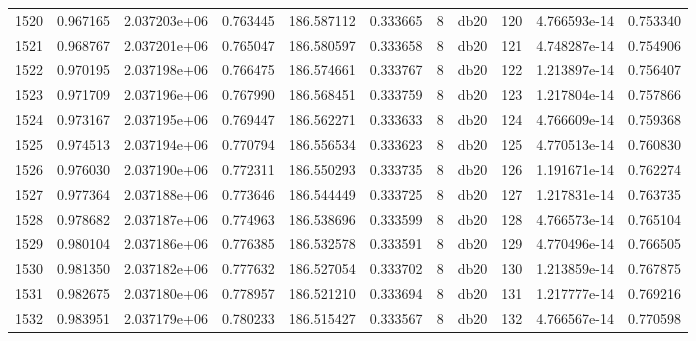 \begin{tabular}{lrrrrrrlrrr}
1520 &    0.967165 &        2.037203e+06 &  0.763445 &              186.587112 &    0.333665 &       8 &         db20 &    120 &   4.766593e-14 &      0.753340 \\
1521 &    0.968767 &        2.037201e+06 &  0.765047 &              186.580597 &    0.333658 &       8 &         db20 &    121 &   4.748287e-14 &      0.754906 \\
1522 &    0.970195 &        2.037198e+06 &  0.766475 &              186.574661 &    0.333767 &       8 &         db20 &    122 &   1.213897e-14 &      0.756407 \\
1523 &    0.971709 &        2.037196e+06 &  0.767990 &              186.568451 &    0.333759 &       8 &         db20 &    123 &   1.217804e-14 &      0.757866 \\
1524 &    0.973167 &        2.037195e+06 &  0.769447 &              186.562271 &    0.333633 &       8 &         db20 &    124 &   4.766609e-14 &      0.759368 \\
1525 &    0.974513 &        2.037194e+06 &  0.770794 &              186.556534 &    0.333623 &       8 &         db20 &    125 &   4.770513e-14 &      0.760830 \\
1526 &    0.976030 &        2.037190e+06 &  0.772311 &              186.550293 &    0.333735 &       8 &         db20 &    126 &   1.191671e-14 &      0.762274 \\
1527 &    0.977364 &        2.037188e+06 &  0.773646 &              186.544449 &    0.333725 &       8 &         db20 &    127 &   1.217831e-14 &      0.763735 \\
1528 &    0.978682 &        2.037187e+06 &  0.774963 &              186.538696 &    0.333599 &       8 &         db20 &    128 &   4.766573e-14 &      0.765104 \\
1529 &    0.980104 &        2.037186e+06 &  0.776385 &              186.532578 &    0.333591 &       8 &         db20 &    129 &   4.770496e-14 &      0.766505 \\
1530 &    0.981350 &        2.037182e+06 &  0.777632 &              186.527054 &    0.333702 &       8 &         db20 &    130 &   1.213859e-14 &      0.767875 \\
1531 &    0.982675 &        2.037180e+06 &  0.778957 &              186.521210 &    0.333694 &       8 &         db20 &    131 &   1.217777e-14 &      0.769216 \\
1532 &    0.983951 &        2.037179e+06 &  0.780233 &              186.515427 &    0.333567 &       8 &         db20 &    132 &   4.766567e-14 &      0.770598 \\

\end{tabular}
